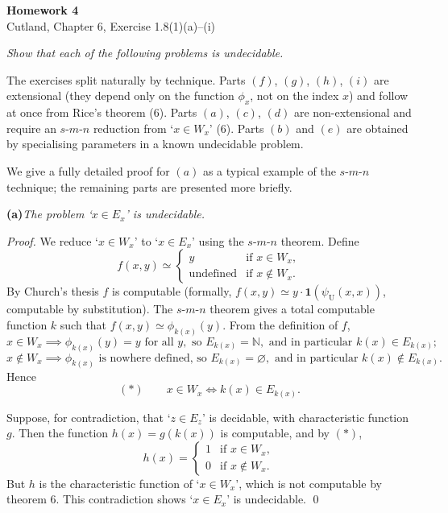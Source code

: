 \documentclass[fleqn]{article}
\begin{document}
\begin{center}
{\Large \textbf{Homework 4}}\\[0.5em]
{\large Cutland, Chapter 6, Exercise 1.8(1)(a)--(i)}
\end{center}

\bigskip

\noindent\textit{Show that each of the following problems is undecidable.}

\bigskip

\noindent The exercises split naturally by technique. Parts $(f)$, $(g)$, $(h)$, $(i)$ are extensional (they depend only on the function $\phi_x$, not on the index $x$) and follow at once from Rice's theorem (6). Parts $(a)$, $(c)$, $(d)$ are non-extensional and require an $s$\nobreakdash-$m$\nobreakdash-$n$ reduction from `$x \in W_x$' (6). Parts $(b)$ and $(e)$ are obtained by specialising parameters in a known undecidable problem.

We give a fully detailed proof for $(a)$ as a typical example of the $s$\nobreakdash-$m$\nobreakdash-$n$ technique; the remaining parts are presented more briefly.

\bigskip

\noindent\textbf{(a)}\quad\textit{The problem `$x \in E_x$' is undecidable.}

\medskip

\textit{Proof.} We reduce `$x \in W_x$' to `$x \in E_x$' using the $s$\nobreakdash-$m$\nobreakdash-$n$ theorem. Define
\[
f(x, y) \simeq
\begin{cases}
y & \text{if } x \in W_x, \\
\text{undefined} & \text{if } x \notin W_x.
\end{cases}
\]
By Church's thesis $f$ is computable (formally, $f(x, y) \simeq y \cdot \mathbf{1}(\psi_{\mathrm{U}}(x, x))$, computable by substitution). The $s$\nobreakdash-$m$\nobreakdash-$n$ theorem gives a total computable function $k$ such that $f(x, y) \simeq \phi_{k(x)}(y)$. From the definition of $f$,
\[
x \in W_x \implies \phi_{k(x)}(y) = y \text{ for all } y, \text{ so } E_{k(x)} = \mathbb{N}, \text{ and in particular } k(x) \in E_{k(x)};
\]
\[
x \notin W_x \implies \phi_{k(x)} \text{ is nowhere defined, so } E_{k(x)} = \varnothing, \text{ and in particular } k(x) \notin E_{k(x)}.
\]
Hence
\[
(*)\qquad x \in W_x \iff k(x) \in E_{k(x)}.
\]

Suppose, for contradiction, that `$z \in E_z$' is decidable, with characteristic function $g$. Then the function $h(x) = g(k(x))$ is computable, and by $(*)$,
\[
h(x) =
\begin{cases}
1 & \text{if } x \in W_x, \\
0 & \text{if } x \notin W_x.
\end{cases}
\]
But $h$ is the characteristic function of `$x \in W_x$', which is not computable by theorem 6. This contradiction shows `$x \in E_x$' is undecidable. \qed
\end{document}
